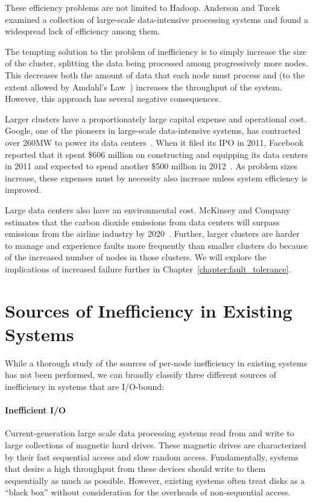 These efficiency problems are not limited to Hadoop. Anderson and
Tucek~\cite{efficiency-matters} examined a collection of large-scale
data-intensive processing systems and found a widespread lack of efficiency
among them.

The tempting solution to the problem of inefficiency is to simply increase the
size of the cluster, splitting the data being processed among progressively
more nodes. This decreases both the amount of data that each node must process
and (to the extent allowed by Amdahl's Law~\cite{amdahls_law}) increases the
throughput of the system. However, this approach has several negative
consequences.

Larger clusters have a proportionately large capital expense and operational
cost. Google, one of the pioneers in large-scale data-intensive systems, has
contracted over 260MW to power its data
centers~\cite{google-dc-power-blog}. When it filed its IPO in 2011, Facebook
reported that it spent \$606 million on constructing and equipping its data
centers in 2011 and expected to spend another \$500 million in
2012~\cite{facebook-ipo}. As problem sizes increase, these expenses must by
necessity also increase unless system efficiency is improved.

Large data centers also have an environmental cost. McKinsey and Company
estimates that the carbon dioxide emissions from data centers will surpass
emissions from the airline industry by 2020~\cite{mckinsey-co2-study}.
Further, larger clusters are harder to manage and experience faults more
frequently than smaller clusters do because of the increased number of nodes in
those clusters. We will explore the implications of increased failure further
in Chapter~\ref{chapter:fault_tolerance}.

\section{Sources of Inefficiency in Existing Systems}

While a thorough study of the sources of per-node inefficiency in existing
systems has not been performed, we can broadly classify three different sources
of inefficiency in systems that are I/O-bound:

\paragraph{Inefficient I/O} Current-generation large scale data processing
systems read from and write to large collections of magnetic hard drives. These
magnetic drives are characterized by their fast sequential access and slow
random access. Fundamentally, systems that desire a high throughput from these
devices should write to them sequentially as much as possible. However,
existing systems often treat disks as a ``black box'' without consideration for
the overheads of non-sequential access.

